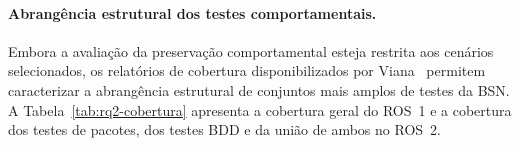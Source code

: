 \paragraph{Abrangência estrutural dos testes comportamentais.}

Embora a avaliação da preservação comportamental esteja restrita aos cenários selecionados, os relatórios de cobertura disponibilizados por Viana~\cite{BSN_TRACES} permitem caracterizar a abrangência estrutural de conjuntos mais amplos de testes da BSN. A Tabela~\ref{tab:rq2-cobertura} apresenta a cobertura geral do ROS~1 e a cobertura dos testes de pacotes, dos testes BDD e da união de ambos no ROS~2.

